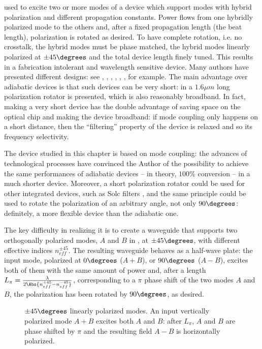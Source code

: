 \begin{description}
  used to excite two or more modes of a device which support modes
  with hybrid polarization and different propagation constants. Power
  flows from one hybridly polarized mode to the others and, after a
  fixed propagation length (the beat length), polarization is rotated
  as desired. To have complete rotation, i.e. no crosstalk, the hybrid
  modes must be phase matched, the hybrid modes linearly polarized at
  $\pm 45\degrees$ and the total device length finely tuned. This
  results in a fabrication intolerant and wavelength sensitive
  device. Many authors have presented different designs: see
  \cite{huang}, \cite{tzolov}, \cite{lui}, \cite{kotlyar_compact},
  \cite{correia_genetic}, \cite{elrefaei_slanted}, for example. The
  main advantage over adiabatic devices is that such devices can be
  very short: in \cite{kotlyar_compact} a $1.6 \mu m$ long
  polarization rotator is presented, which is also reasonably
  broadband. In fact, making a very short device has the double
  advantage of saving space on the optical chip and making the device
  broadband: if mode coupling only happens on a short distance, then
  the ``filtering'' property of the device is relaxed and so its
  frequency selectivity.
\end{description}

The device studied in this chapter is based on mode coupling: the
advances of technological processes have convinced the Author of the
possibility to achieve the same performances of adiabatic devices --
in theory, $100\%$ conversion -- in a much shorter device. Moreover, a
short polarization rotator could be used for other integrated devices,
such as Solc filters \cite{solc_birefringent}, and the same principle
could be used to rotate the polarization of an arbitrary angle, not
only $90\degrees$: definitely, a more flexible device than the
adiabatic one.

The key difficulty in realizing it is to create a waveguide that
supports two orthogonally polarized modes, $A$ and $B$ in
, at $\pm 45\degrees$, with different
effective indices $n_{eff}^{\pm 45}$. The resulting waveguide behaves
as a half-wave plate: the input mode, polarized at $0\degrees$ ($A+B$),
or $90\degrees$ ($A - B$), excites both of them with the same amount
of power and, after a length $L_\pi =
\frac{\lambda}{2\Abs{n_{eff}^{+45} - n_{eff}^{-45}}}$, corresponding
to a $\pi$ phase shift of the two modes $A$ and $B$, the polarization
has been rotated by $90\degrees$, as desired.

\begin{figure}[htbp]
  \begin{center}
    \resizebox{5cm}{!}{}
  \end{center}
  \caption{$\pm45\degrees$ linearly polarized modes. An input
    vertically polarized mode $A+B$ excites both $A$ and $B$: after
    $L_\pi$, $A$ and $B$ are phase shifted by $\pi$ and the resulting
    field $A - B$ is horizontally polarized.}
  \label{fig:polrot_modes}
\end{figure}

